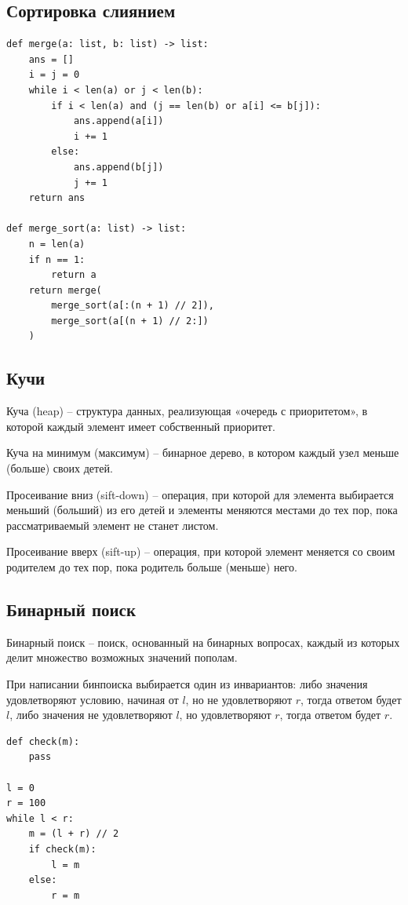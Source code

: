 \documentclass[12pt]{article}
\begin{document}
\subsection{Сортировка слиянием}

\begin{algorithm}
	\hfill
	\begin{verbatim}
def merge(a: list, b: list) -> list:
	ans = []
	i = j = 0
	while i < len(a) or j < len(b):
		if i < len(a) and (j == len(b) or a[i] <= b[j]):
			ans.append(a[i])
			i += 1
		else:
			ans.append(b[j])
			j += 1
	return ans

def merge_sort(a: list) -> list:
	n = len(a)
	if n == 1:
		return a
	return merge(
		merge_sort(a[:(n + 1) // 2]),
		merge_sort(a[(n + 1) // 2:])
	)
	\end{verbatim}
\end{algorithm}

\subsection{Кучи}

\begin{definition}
	Куча (heap) -- структура данных, реализующая «очередь с
	приоритетом», в которой каждый элемент имеет собственный приоритет.
\end{definition}
\begin{definition}
	Куча на минимум (максимум) -- бинарное дерево, в котором каждый узел
	меньше (больше) своих детей.
\end{definition}
\begin{definition}
	Просеивание вниз (sift-down) -- операция, при которой для элемента
	выбирается меньший (больший) из его детей и элементы меняются
	местами до тех пор, пока рассматриваемый элемент не станет листом.
\end{definition}
\begin{definition}
	Просеивание вверх (sift-up) -- операция, при которой элемент
	меняется со своим родителем до тех пор, пока родитель больше (меньше) него.
\end{definition}

\subsection{Бинарный поиск}

\begin{definition}
	Бинарный поиск -- поиск, основанный на бинарных вопросах, каждый из
	которых делит множество возможных значений пополам.
\end{definition}
\begin{algorithm}
	При написании бинпоиска выбирается один из инвариантов: либо
	значения удовлетворяют условию, начиная от $l$, но не удовлетворяют
	$r$, тогда ответом будет $l$, либо значения не удовлетворяют $l$, но
	удовлетворяют $r$, тогда ответом будет $r$.
	\begin{verbatim}
def check(m):
	pass

l = 0
r = 100
while l < r:
	m = (l + r) // 2
	if check(m):
		l = m
	else:
		r = m
	\end{verbatim}
\end{algorithm}
\end{document}

